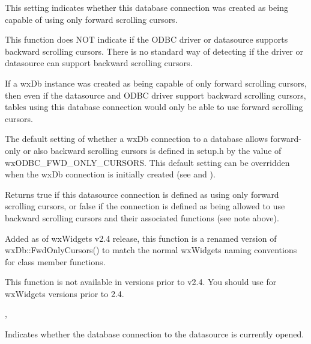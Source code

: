 \label{wxdbisfwdonlycursors}


This setting indicates whether this database connection was created
as being capable of using only forward scrolling cursors.

This function does NOT indicate if the ODBC driver or datasource supports
backward scrolling cursors.  There is no standard way of detecting if the
driver or datasource can support backward scrolling cursors.

If a wxDb instance was created as being capable of only forward scrolling
cursors, then even if the datasource and ODBC driver support backward
scrolling cursors, tables using this database connection would only be able
to use forward scrolling cursors.

The default setting of whether a wxDb connection to a database allows
forward-only or also backward scrolling cursors is defined in setup.h by the
value of wxODBC\_FWD\_ONLY\_CURSORS.  This default setting can be overridden
when the wxDb connection is initially created (see
 and ).


Returns true if this datasource connection is defined as using only forward
scrolling cursors, or false if the connection is defined as being allowed to
use backward scrolling cursors and their associated functions (see note above).


Added as of wxWidgets v2.4 release, this function is a renamed version of
wxDb::FwdOnlyCursors() to match the normal wxWidgets naming conventions for
class member functions.

This function is not available in versions prior to v2.4.  You should
use  for wxWidgets
versions prior to 2.4.


, 

\label{wxdbisopen}


Indicates whether the database connection to the datasource is currently
opened.


